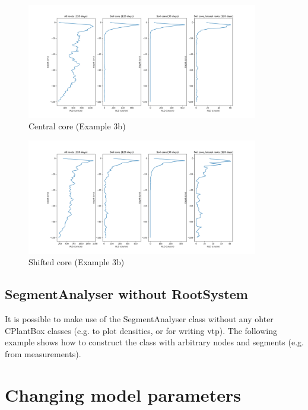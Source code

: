\documentclass[a4paper]{article}
\begin{document}
\begin{figure}
\centering
\includegraphics[width=0.9\textwidth]{example_3b1.png} 
\caption{Central core (Example 3b)} \label{fig:central}
\end{figure}

\begin{figure}
\centering
\includegraphics[width=0.9\textwidth]{example_3b2.png} 
\caption{Shifted core (Example 3b)} \label{fig:shifted}
\end{figure}


\subsection{SegmentAnalyser without RootSystem}

It is possible to make use of the SegmentAnalyser class without any ohter CPlantBox classes (e.g. to plot densities, or for writing vtp). The following example shows how to construct the class with arbitrary nodes and segments (e.g. from measurements). 






\section{Changing model parameters}
\end{document}
